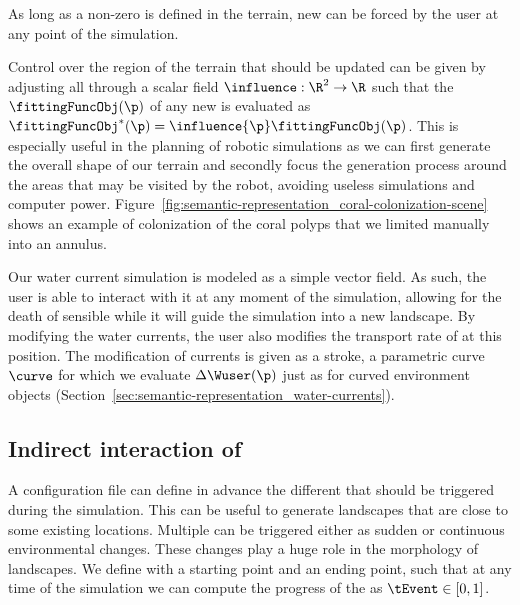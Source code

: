 As long as a non-zero  is defined in the terrain, new  can be forced by the user at any point of the simulation. 

Control over the region of the terrain that should be updated can be given by adjusting all  through a scalar field $\influence: \R^2 \to \R $ such that the  $\fittingFuncObj(\p)$ of any new  is evaluated as $\fittingFuncObj^*(\p) = \influence{\p} \fittingFuncObj(\p)$. This is especially useful in the planning of robotic simulations as we can first generate the overall shape of our terrain and secondly focus the generation process around the areas that may be visited by the robot, avoiding useless simulations and computer power. 
Figure~\ref{fig:semantic-representation_coral-colonization-scene} shows an example of colonization of the coral polyps that we limited manually into an annulus.



Our water current simulation is modeled as a simple vector field. As such, the user is able to interact with it at any moment of the simulation, allowing for the death of sensible  while it will guide the simulation into a new landscape. By modifying the water currents, the user also modifies the transport rate of  at this position. The modification of currents is given as a stroke, a parametric curve $\curve$ for which we evaluate $\Delta \Wuser(\p)$ just as for curved environment objects (Section~\ref{sec:semantic-representation_water-currents}).

\subsection{Indirect interaction of }
\label{sec:semantic-representation_events}
A configuration file can define in advance the different  that should be triggered during the simulation. This can be useful to generate landscapes that are close to some existing locations. 
Multiple  can be triggered either as sudden or continuous environmental changes. These changes play a huge role in the morphology of landscapes.
We define  with a starting point and an ending point, such that at any time of the simulation we can compute the progress of the  as $\tEvent \in [0, 1]$.

